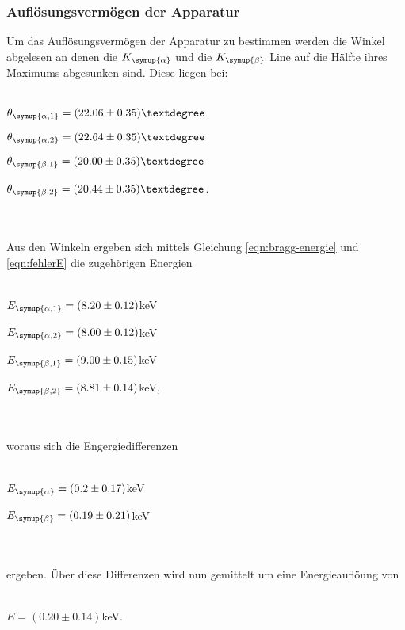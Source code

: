     \subsubsection{Auflösungsvermögen der Apparatur}
        \label{sec:cu} 
        Um das Auflösungsvermögen der Apparatur zu bestimmen werden die Winkel abgelesen an denen die $K_{\symup{\alpha}}$ und die $K_{\symup{\beta}}$
        Line auf die Hälfte ihres Maximums abgesunken sind.
        Diese liegen bei:
        \\ \\
        \centerline{$\theta_{\symup{\alpha,1}} = (22.06 \pm 0.35)°$}
        \centerline{$\theta_{\symup{\alpha,2}} = (22.64 \pm 0.35)°$}
        \centerline{$\theta_{\symup{\beta,1}} = (20.00 \pm 0.35)°$}
        \centerline{$\theta_{\symup{\beta,2}} = (20.44 \pm 0.35)°$.}
        \\ \\
        Aus den Winkeln ergeben sich mittels Gleichung \eqref{eqn:bragg-energie} und \eqref{eqn:fehlerE} die zugehörigen Energien
        \\ \\
        \centerline{$E_{\symup{\alpha,1}} = (8.20 \pm 0.12)$keV}
        \centerline{$E_{\symup{\alpha,2}} = (8.00 \pm 0.12)$keV}
        \centerline{$E_{\symup{\beta,1}} =  (9.00 \pm 0.15)$keV}
        \centerline{$E_{\symup{\beta,2}} =  (8.81 \pm 0.14)$keV,}
        \\ \\
        woraus sich die Engergiedifferenzen
        \\ \\
        \centerline{$E_{\symup{\alpha}} = (0.2 \pm 0.17)$keV}
        \centerline{$E_{\symup{\beta}} = (0.19 \pm 0.21)$keV}
        \\ \\
        ergeben. Über diese Differenzen wird nun gemittelt um eine Energieauflöung von
        \\ \\
        \centerline{$E = (0.20 \pm 0.14) $keV.}
        \\ \\
